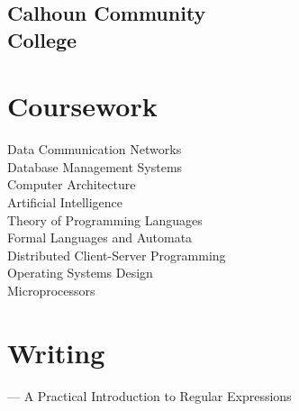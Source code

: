 \documentclass[]{resume}
\begin{document}
\begin{minipage}[t]{0.33\textwidth}
\sectionsep

\subsection[Calhoun Community College]{\texorpdfstring{Calhoun Community\\ College}{Calhoun Community College}}

\sectionsep

\section{Coursework}
Data Communication Networks \\
Database Management Systems \\
Computer Architecture \\
Artificial Intelligence \\
Theory of Programming Languages \\
Formal Languages and Automata \\
Distributed Client-Server Programming \\
Operating Systems Design \\
Microprocessors	\\

\sectionsep


\section{Writing}
\href{https://dev.to/hawkinjs/dont-fear-the-regex-a-practical-introduction-to-regular-expressions}{} --- A Practical Introduction to Regular Expressions \\


\end{minipage}
\end{document}
